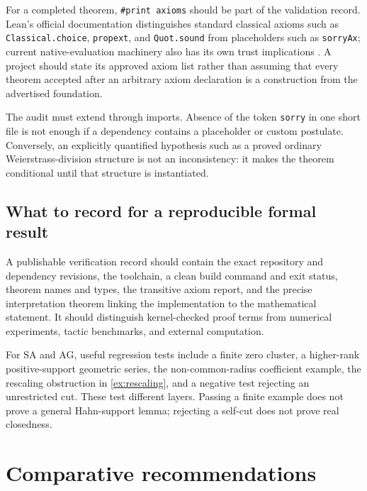 \documentclass[11pt,letterpaper]{article}
\theoremstyle{definition}
\theoremstyle{remark}
\numberwithin{equation}{section}
\begin{document}
For a completed theorem, \texttt{\#print axioms} should be part of the validation record. Lean's official documentation distinguishes standard classical axioms such as \texttt{Classical.choice}, \texttt{propext}, and \texttt{Quot.sound} from placeholders such as \texttt{sorryAx}; current native-evaluation machinery also has its own trust implications \cite{LeanAxioms,LeanValidation}. A project should state its approved axiom list rather than assuming that every theorem accepted after an arbitrary axiom declaration is a construction from the advertised foundation.

The audit must extend through imports. Absence of the token \texttt{sorry} in one short file is not enough if a dependency contains a placeholder or custom postulate. Conversely, an explicitly quantified hypothesis such as a proved ordinary Weierstrass-division structure is not an inconsistency: it makes the theorem conditional until that structure is instantiated.

\subsection{What to record for a reproducible formal result}
A publishable verification record should contain the exact repository and dependency revisions, the toolchain, a clean build command and exit status, theorem names and types, the transitive axiom report, and the precise interpretation theorem linking the implementation to the mathematical statement. It should distinguish kernel-checked proof terms from numerical experiments, tactic benchmarks, and external computation.

For SA and AG, useful regression tests include a finite zero cluster, a higher-rank positive-support geometric series, the non-common-radius coefficient example, the rescaling obstruction in \cref{ex:rescaling}, and a negative test rejecting an unrestricted cut. These test different layers. Passing a finite example does not prove a general Hahn-support lemma; rejecting a self-cut does not prove real closedness.

\section{Comparative recommendations}\label{sec:recommendations}
\end{document}
